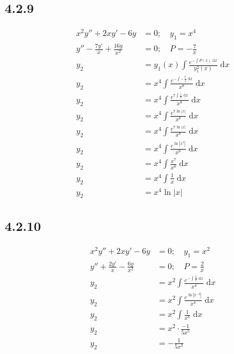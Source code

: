 \documentclass{article}
\begin{document}
\subsection{4.2.9}
\begin{align*}
    x^2y''+2xy'-6y &= 0; \quad y_1 = x^4\\
    y''-\frac{7y'}{x}+\frac{16y}{x^2}  &= 0; \quad P = -\frac{7}{x}  \\
    y_2 &= y_1(x) \int \frac{e^{-\int P(x) \; \mathrm{d}x}}{y_1^2(x)} \; \mathrm{d}x\\
    y_2 &= x^4 \int \frac{e^{-\int -\frac{7}{x} \; \mathrm{d}x}}{x^8} \; \mathrm{d}x\\
    y_2 &= x^4 \int \frac{e^{7\int \frac{1}{x} \; \mathrm{d}x}}{x^8} \; \mathrm{d}x\\
    y_2 &= x^4 \int \frac{e^{7 \ln\left|x\right|}}{x^8} \; \mathrm{d}x\\
    y_2 &= x^4 \int \frac{e^{7 \ln\left|x\right|}}{x^8} \; \mathrm{d}x\\
    y_2 &= x^4 \int \frac{e^{ \ln\left|x^7\right|}}{x^8} \; \mathrm{d}x\\
    y_2 &= x^4 \int \frac{x^7}{x^8} \; \mathrm{d}x\\
    y_2 &= x^4 \int \frac{1}{x} \; \mathrm{d}x\\
    y_2 &= x^4 \ln\left|x\right|
\end{align*}

\subsection{4.2.10}
\begin{align*}
    x^2y''+2xy'-6y &= 0; \quad y_1 = x^2\\ 
    y''+\frac{2y'}{x}-\frac{6y}{x^2} &= 0; \quad P = \frac{2}{x}\\
    y_2 &=x^2\int \frac{e^{-\int \frac{2}{x} \; \mathrm{d}x}}{x^4} \; \mathrm{d}x\\
    y_2 &=x^2\int \frac{e^{\ln\left|x^{-2}\right|}}{x^4} \; \mathrm{d}x\\
    y_2 &=x^2\int \frac{1}{x^6} \; \mathrm{d}x\\
    y_2 &= x^2 \cdot \frac{-1}{5x^5}\\
    y_2 &= -\frac{1}{5x^3}
\end{align*}
        
\newpage
\end{document}
